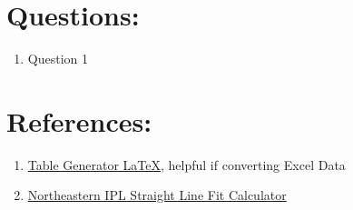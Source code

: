\documentclass[12pt,a4paper]{article}
\begin{document}
	\section*{Questions:}
		\begin{enumerate}
			\item Question 1
		\end{enumerate}
		
	\section*{References:}
		\begin{enumerate}
			\item \href{https://www.tablesgenerator.com/#}{Table Generator \LaTeX}, helpful if converting Excel Data
			\item \href{https://web.northeastern.edu/ipl/data-analysis/straight-line-fit/}{Northeastern IPL Straight Line Fit Calculator}
		\end{enumerate}
\end{document}
